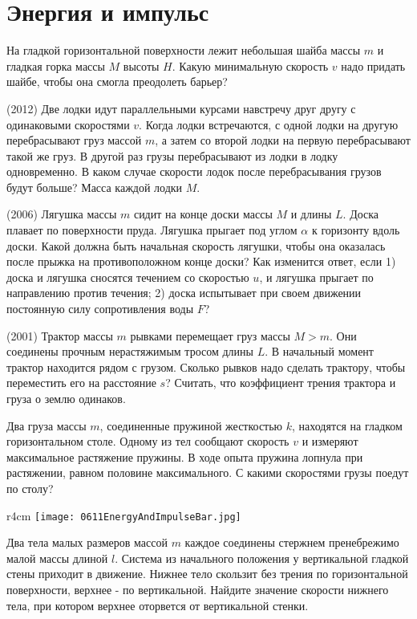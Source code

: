 \section{Энергия и импульс}
\AddProb На гладкой горизонтальной поверхности лежит небольшая шайба массы $m$ и гладкая горка массы $M$ высоты $H$. 
Какую минимальную скорость $v$ надо придать шайбе, чтобы она смогла преодолеть барьер?

\AddProb (2012) Две лодки идут параллельными курсами навстречу друг другу с одинаковыми скоростями $v$. 
Когда лодки встречаются, с одной лодки на другую перебрасывают груз массой $m$, а затем со второй лодки на первую перебрасывают такой же груз. 
В другой раз грузы перебрасывают из лодки в лодку одновременно. В каком случае скорости лодок после перебрасывания грузов будут больше? 
Масса каждой лодки $M$.

\AddProb (2006) Лягушка массы $m$ сидит на конце доски массы $M$ и длины $L$. Доска плавает по поверхности пруда. 
Лягушка прыгает под углом $\alpha$ к горизонту вдоль доски. Какой должна быть начальная скорость лягушки, 
чтобы она оказалась после прыжка на противоположном конце доски? Как изменится ответ, если 1) доска и лягушка сносятся течением со скоростью $u$,
 и лягушка прыгает по направлению против течения; 2) доска испытывает при своем движении постоянную силу сопротивления воды $F$?

\AddProb (2001) Трактор массы $m$ рывками перемещает груз массы $M>m$. Они соединены прочным нерастяжимым тросом длины $L$. 
В начальный момент трактор находится рядом с грузом. Сколько рывков надо сделать трактору, чтобы переместить его на расстояние $s$? 
Считать, что коэффициент трения трактора и груза о землю одинаков.

\AddProb Два груза массы $m$, соединенные пружиной жесткостью $k$, находятся на гладком горизонтальном столе. 
Одному из тел сообщают скорость $v$ и измеряют максимальное растяжение пружины. 
В ходе опыта пружина лопнула при растяжении, равном половине максимального. С какими скоростями грузы поедут по столу?

\begin{wrapfigure}{r}{4cm}
\texttt{[image: 0611EnergyAndImpulseBar.jpg]}
\end{wrapfigure}

\AddProb Два тела малых размеров массой $m$ каждое соединены стержнем пренебрежимо малой массы длиной $l$. 
Система из начального положения у вертикальной гладкой стены приходит в движение. 
Нижнее тело скользит без трения по горизонтальной поверхности, верхнее - по вертикальной. 
Найдите значение скорости нижнего тела, при котором верхнее оторвется от вертикальной стенки.

